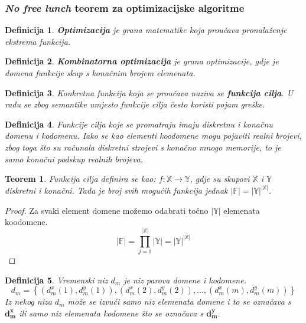 \documentclass[times, utf8, diplomski, numeric]{fer}
\newtheorem{definition}{Definicija}
\newtheorem{theorem}{Teorem}
\begin{document}
\subsubsection{\emph{No free lunch} teorem za optimizacijske algoritme}

\begin{definition}
\textbf{Optimizacija} je grana matematike koja proučava pronalaženje ekstrema funkcija.
\end{definition}

\begin{definition}
\textbf{Kombinatorna optimizacija} je grana optimizacije, gdje je domena funkcije skup s konačnim brojem elemenata.
\end{definition}

\begin{definition}
Konkretna funkcija koja se proučava naziva se \textbf{funkcija cilja}.
U radu se zbog semantike umjesto funkcije cilja često koristi pojam greške.
\end{definition}

\begin{definition}
Funkcije cilja koje se promatraju imaju diskretnu i konačnu domenu i kodomenu. Iako se kao elementi koodomene mogu pojaviti realni brojevi, zbog toga što su računala diskretni strojevi s konačno mnogo memorije, to je samo konačni podskup realnih brojeva.
\end{definition}

\begin{theorem}
Funkcija cilja definira se kao: $f : \mathbb{X} \rightarrow \mathbb{Y}$, gdje su skupovi $\mathbb{X}$ i $\mathbb{Y}$ diskretni i konačni. Tada je broj svih mogućih funkcija jednak $|\mathbb{F}| = |\mathbb{Y}|^{|\mathbb{X}|}$. 
\end{theorem}

\begin{proof}
Za svaki element domene možemo odabrati točno $|\mathbb{Y}|$ elemenata koodomene. 
\begin{equation}
|\mathbb{F}| = \prod_{j=1}^{|\mathbb{X}|} |\mathbb{Y}| =  |\mathbb{Y}|^{|\mathbb{X}|}
\end{equation}
\end{proof}

\begin{definition}
Vremenski niz $d_m$ je niz parova domene i kodomene.
\begin{equation}
d_m = \left \{ (d_m^x(1), d_m^y(1)), (d_m^x(2), d_m^y(2)), ..., (d_m^x(m), d_m^y(m))\right \}
\end{equation} 
Iz nekog niza $d_m$ može se izvući samo niz elemenata domene i to se označava s $\mathbf{d_m^x}$ ili samo niz elemenata kodomene što se označava s $\mathbf{d_m^y}$.
\end{definition}
\end{document}
